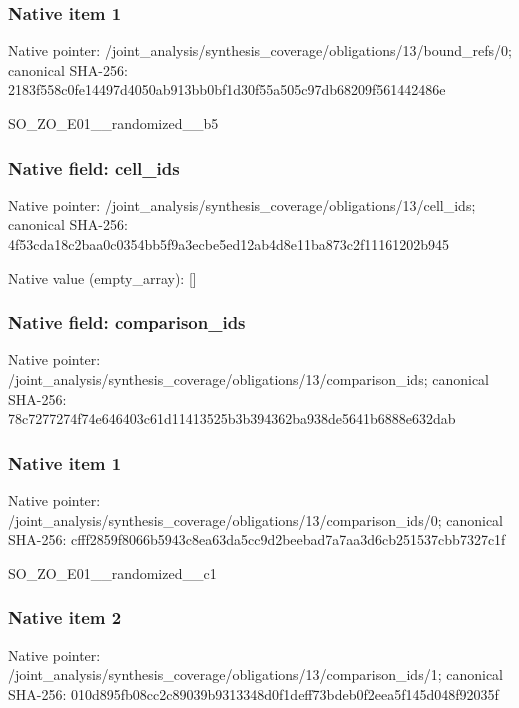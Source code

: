 \documentclass[10pt,a4paper]{article}
\begin{document}
\subsubsection{Native item 1}
Native pointer: /joint\_\allowbreak{}analysis/synthesis\_\allowbreak{}coverage/obligations/13/bound\_\allowbreak{}refs/0; canonical SHA-256: 2183f558c0fe14497d4050ab913bb0bf1d30f55a505c97db68209f561442486e

\begingroup\raggedright\sloppy SO\_\allowbreak{}ZO\_\allowbreak{}E01\_\allowbreak{}\_\allowbreak{}randomized\_\allowbreak{}\_\allowbreak{}b5\par\endgroup

\subsubsection{Native field: cell\_\allowbreak{}ids}
Native pointer: /joint\_\allowbreak{}analysis/synthesis\_\allowbreak{}coverage/obligations/13/cell\_\allowbreak{}ids; canonical SHA-256: 4f53cda18c2baa0c0354bb5f9a3ecbe5ed12ab4d8e11ba873c2f11161202b945

Native value (empty\_\allowbreak{}array): []

\subsubsection{Native field: comparison\_\allowbreak{}ids}
Native pointer: /joint\_\allowbreak{}analysis/synthesis\_\allowbreak{}coverage/obligations/13/comparison\_\allowbreak{}ids; canonical SHA-256: 78c7277274f74e646403c61d11413525b3b394362ba938de5641b6888e632dab

\subsubsection{Native item 1}
Native pointer: /joint\_\allowbreak{}analysis/synthesis\_\allowbreak{}coverage/obligations/13/comparison\_\allowbreak{}ids/0; canonical SHA-256: cfff2859f8066b5943c8ea63da5cc9d2beebad7a7aa3d6cb251537cbb7327c1f

\begingroup\raggedright\sloppy SO\_\allowbreak{}ZO\_\allowbreak{}E01\_\allowbreak{}\_\allowbreak{}randomized\_\allowbreak{}\_\allowbreak{}c1\par\endgroup

\subsubsection{Native item 2}
Native pointer: /joint\_\allowbreak{}analysis/synthesis\_\allowbreak{}coverage/obligations/13/comparison\_\allowbreak{}ids/1; canonical SHA-256: 010d895fb08cc2c89039b9313348d0f1deff73bdeb0f2eea5f145d048f92035f
\end{document}
